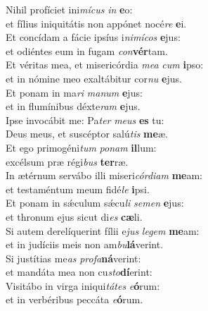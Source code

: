 \evenverse Nihil profíciet ini\textit{mí}\textit{cus} \textit{in} \textbf{e}o:~\*\\
\evenverse et fílius iniquitátis non appónet nocé\textit{re} \textbf{e}i.\\
\oddverse Et concídam a fácie ipsíus i\textit{ni}\textit{mí}\textit{cos} \textbf{e}jus:~\*\\
\oddverse et odiéntes eum in fugam \textit{con}\textbf{vér}tam.\\
\evenverse Et véritas mea, et misericórdia \textit{me}\textit{a} \textit{cum} \textbf{i}pso:~\*\\
\evenverse et in nómine meo exaltábitur cor\textit{nu} \textbf{e}jus.\\
\oddverse Et ponam in ma\textit{ri} \textit{ma}\textit{num} \textbf{e}jus:~\*\\
\oddverse et in flumínibus déxte\textit{ram} \textbf{e}jus.\\
\evenverse Ipse invocábit me: Pa\textit{ter} \textit{me}\textit{us} \textbf{es} tu:~\*\\
\evenverse Deus meus, et suscéptor salú\textit{tis} \textbf{me}æ.\\
\oddverse Et ego primogéni\textit{tum} \textit{po}\textit{nam} \textbf{il}lum:~\*\\
\oddverse excélsum præ régi\textit{bus} \textbf{ter}ræ.\\
\evenverse In ætérnum servábo illi miseri\textit{cór}\textit{di}\textit{am} \textbf{me}am:~\*\\
\evenverse et testaméntum meum fidé\textit{le} \textbf{i}psi.\\
\oddverse Et ponam in sǽculum sǽcu\textit{li} \textit{se}\textit{men} \textbf{e}jus:~\*\\
\oddverse et thronum ejus sicut di\textit{es} \textbf{cæ}li.\\
\evenverse Si autem derelíquerint fílii e\textit{jus} \textit{le}\textit{gem} \textbf{me}am:~\*\\
\evenverse et in judíciis meis non am\textit{bu}\textbf{lá}verint.\\
\oddverse Si justítias me\textit{as} \textit{pro}\textit{fa}\textbf{ná}verint:~\*\\
\oddverse et mandáta mea non cu\textit{sto}\textbf{dí}erint:\\
\evenverse Visitábo in virga iniqui\textit{tá}\textit{tes} \textit{e}\textbf{ó}rum:~\*\\
\evenverse et in verbéribus peccáta \textit{e}\textbf{ó}rum.\\
